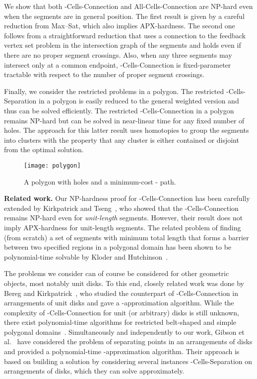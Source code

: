 \documentclass[11pt,a4paper]{article}
\begin{document}
We show that both {\sc -Cells-Connection} and {\sc All-Cells-Connection} are NP-hard even when the segments are in general position. The first result is given by a careful reduction from {\sc Max--Sat}, which also implies APX-hardness. The second one follows from a straightforward reduction that uses a connection to the feedback vertex set problem in the intersection graph of the segments and holds even if there are no proper segment crossings. Also, when any three segments may intersect only at a common endpoint, {\sc -Cells-Connection} is fixed-parameter tractable with respect to the number of proper segment crossings. 

Finally, we consider the restricted problems in a polygon. The restricted {\sc -Cells-Separation} in a polygon is easily reduced to the general weighted version and thus can be solved efficiently. The restricted {\sc -Cells-Connection} in a polygon remains NP-hard but can be solved in near-linear time for any fixed number of holes. The approach for this latter result uses homotopies to group the segments into clusters with the property that any cluster is either contained or disjoint from the optimal solution. 

\begin{figure}[t]
\centering
\texttt{[image: polygon]}
\caption{A polygon with holes and a minimum-cost - path.}
\label{fig:polygon}
\end{figure}

\medskip
\noindent
{\bf Related work.} Our NP-hardness proof for {\sc -Cells-Connection} has been carefully extended by Kirkpatrick and Tseng~\cite{tseng-thesis}, who showed that the {\sc -Cells-Connection} remains NP-hard even for \emph{unit-length} segments. However, their result does not imply APX-hardness for unit-length segments. 
The related problem of finding (from scratch) a set of segments with minimum total length that forms a barrier between two specified regions in a polygonal domain has been shown to be polynomial-time solvable by Kloder and Hutchinson~\cite{KH07}.

The problems we consider can of course be considered for other geometric objects, most notably unit disks. To this end, closely related work was done by Bereg and Kirkpatrick~\cite{BK09}, who studied the counterpart of {\sc -Cells-Connection} in arrangements of unit disks and gave a -approximation algorithm.  While the complexity of {\sc -Cells-Connection} for unit (or arbitrary) disks is still unknown, there exist polynomial-time algorithms for restricted belt-shaped and simple polygonal domains~\cite{KLA07}. Simultaneously and independently to our work, Gibson et al.~\cite{gkv-ipud-11} have considered the problem of separating  points in an arrangements of disks and provided a polynomial-time -approximation algorithm. Their approach is based on building a solution by considering several instances {\sc -Cells-Separation} on arrangements of disks, which they can solve approximately.
\end{document}
